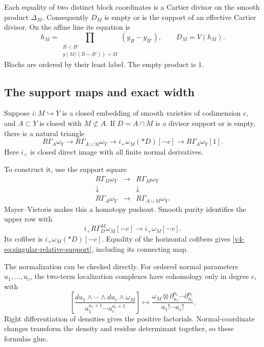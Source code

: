 Each equality of two distinct block
coordinates is a Cartier divisor on
the smooth product \(\Delta_M\).
Consequently \(D_M\) is empty or is
the support of an effective Cartier divisor.
On the affine line its equation is
\[
 h_M=\prod_{\substack{B<B'\\g(M/(B\sim B'))\prec M}}
                  (y_B-y_{B'}),\qquad D_M=V(h_M).
\]
Blocks are ordered by their least label.
The empty product is \(1\).

\subsection{The support maps and exact width}

Suppose \(i:M\hookrightarrow Y\) is a closed embedding
of smooth varieties of codimension \(c\), and \(A\subset Y\)
is closed with \(M\not\subset A\).
If \(D=A\cap M\) is a divisor support
or is empty, there is a natural triangle
\begin{equation}\label{v4-eq:singular-relative-support}
 R\Gamma_A\omega_Y\longrightarrow R\Gamma_{A\cup M}\omega_Y
       \longrightarrow i_+\omega_M(*D)[-c]
       \longrightarrow R\Gamma_A\omega_Y[1].
\end{equation}
Here \(i_+\) is closed direct image
with all finite normal derivatives.

To construct it, use the support square
\[
 \begin{matrix}
 R\Gamma_D\omega_Y&\longrightarrow&R\Gamma_M\omega_Y\\
 \downarrow&&\downarrow\\
 R\Gamma_A\omega_Y&\longrightarrow&R\Gamma_{A\cup M}\omega_Y .
 \end{matrix}
\]
Mayer--Vietoris makes this a homotopy pushout.
Smooth purity identifies the upper row with
\[
 i_+R\Gamma_D^M\omega_M[-c]\longrightarrow i_+\omega_M[-c].
\]
Its cofiber is \(i_+\omega_M(*D)[-c]\).
Equality of the horizontal cofibers gives
\eqref{v4-eq:singular-relative-support}, including
its connecting map.

The normalization can be checked directly.
For ordered normal parameters \(u_1,\ldots,u_c\),
the two-term localization complexes have
cohomology only in degree \(c\), with
\[
 \left[\frac{du_1\wedge\cdots\wedge du_c\wedge\omega_M}
                    {u_1^{a_1+1}\cdots u_c^{a_c+1}}\right]
 \longmapsto
       \frac{\omega_M\otimes\partial_{u_1}^{a_1}\cdots
                             \partial_{u_c}^{a_c}}
                 {a_1!\cdots a_c!}.
\]
Right differentiation of densities gives
the positive factorials.
Normal-coordinate changes transform the
density and residue determinant together,
so these formulas glue.

